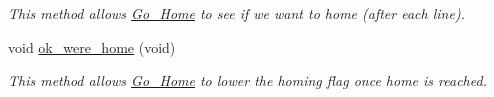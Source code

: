 \begin{DoxyCompactItemize}
\begin{DoxyCompactList}\small\item\em This method allows \hyperlink{class_go___home}{Go\-\_\-\-Home} to see if we want to home (after each line). \end{DoxyCompactList}\item 
\hypertarget{classtask__lines_aef4c5d6e9c67d040a398c2d1791e5f19}{void \hyperlink{classtask__lines_aef4c5d6e9c67d040a398c2d1791e5f19}{ok\-\_\-were\-\_\-home} (void)}\label{classtask__lines_aef4c5d6e9c67d040a398c2d1791e5f19}

\begin{DoxyCompactList}\small\item\em This method allows \hyperlink{class_go___home}{Go\-\_\-\-Home} to lower the homing flag once home is reached. \end{DoxyCompactList}\end{DoxyCompactItemize}
